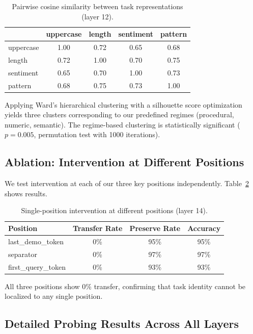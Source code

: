 \documentclass[runningheads]{llncs}
\begin{document}
\begin{table}[h]
\centering
\caption{Pairwise cosine similarity between task representations (layer 12).}
\label{tab:similarity}
\begin{tabular}{@{}lcccc@{}}
\toprule
& uppercase & length & sentiment & pattern \\
\midrule
uppercase & 1.00 & 0.72 & 0.65 & 0.68 \\
length & 0.72 & 1.00 & 0.70 & 0.75 \\
sentiment & 0.65 & 0.70 & 1.00 & 0.73 \\
pattern & 0.68 & 0.75 & 0.73 & 1.00 \\
\bottomrule
\end{tabular}
\end{table}

Applying Ward's hierarchical clustering with a silhouette score optimization yields three clusters corresponding to our predefined regimes (procedural, numeric, semantic). The regime-based clustering is statistically significant ($p = 0.005$, permutation test with 1000 iterations).

\subsection{Ablation: Intervention at Different Positions}

We test intervention at each of our three key positions independently. Table~\ref{tab:position_ablation} shows results.

\begin{table}[h]
\centering
\caption{Single-position intervention at different positions (layer 14).}
\label{tab:position_ablation}
\begin{tabular}{@{}lccc@{}}
\toprule
Position & Transfer Rate & Preserve Rate & Accuracy \\
\midrule
last\_demo\_token & 0\% & 95\% & 95\% \\
separator & 0\% & 97\% & 97\% \\
first\_query\_token & 0\% & 93\% & 93\% \\
\bottomrule
\end{tabular}
\end{table}

All three positions show 0\% transfer, confirming that task identity cannot be localized to any single position.

\subsection{Detailed Probing Results Across All Layers}
\end{document}
